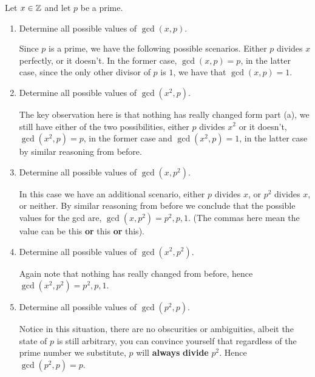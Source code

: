 \documentclass[12pt]{article} %
\begin{document}
  \begin{qstn}
    Let $x \in \mathbb Z$ and let $p$ be a prime.
    \begin{enumerate}[label=(\alph*)]
      \item Determine all possible values of $\gcd (x,p)$.
        \begin{solution}
          Since $p$ is a prime, we have the following possible scenarios. Either $p$ divides $x$ perfectly, or it
          doesn't. In the former case, $\gcd (x,p) = p$, in the latter case, since the only other divisor of $p$ is
           $1$, we have that $\gcd(x,p) = 1$.
        \end{solution}
      \item Determine all possible values of $\gcd (x^2,p)$.
        \begin{solution}
          The key observation here is that nothing has really changed form part (a), we still have either of the
          two possibilities, either $p$ divides $x^2$ or it doesn't, $\gcd (x^2,p) = p$, in the former case and
          $\gcd (x^2,p) = 1$, in the latter case by similar reasoning from before.
        \end{solution}
      \item Determine all possible values of $\gcd (x,p^2)$.
        \begin{solution}
          In this case we have an additional scenario, either $p$ divides $x$, or $p^2$ divides $x$, or neither.
          By similar reasoning from before we conclude that the possible values for the gcd are, $\gcd(x,p^2) =
          p^2,p,1$. (The commas here mean the value can be this \textbf{or} this \textbf{or} this).
        \end{solution}
      \item Determine all possible values of $\gcd (x^2,p^2)$.
        \begin{solution}
          Again note that nothing has really changed from before, hence $\gcd(x^2,p^2) = p^2,p,1$.
        \end{solution}
      \item Determine all possible values of $\gcd (p^2,p)$.
        \begin{solution}
          Notice in this situation, there are no obscurities or ambiguities, albeit the state of $p$ is still
          arbitrary, you can convince yourself that regardless of the prime number we substitute, $p$ will
          \textbf{always} \textbf{divide} $p^2$. Hence
          $\gcd(p^2,p) = p$.
        \end{solution}
    \end{enumerate}
  \end{qstn}
\end{document}
